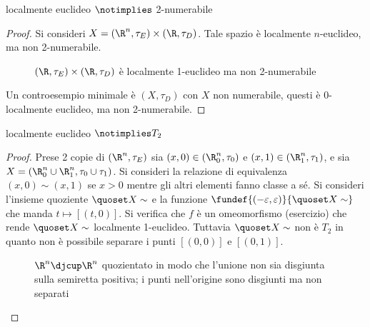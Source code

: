 \begin{prop}
localmente euclideo $\notimplies$ 2-numerabile
\end{prop}
\begin{proof} 
Si consideri $X = (\R^n, \tau _E) \times (\R, \tau _D)$.
Tale spazio è localmente $n$-euclideo, ma non 2-numerabile.

\begin{figure}
	\centering
	
	\caption{$(\R,\tau_E)\times(\R,\tau_D)$ è localmente 1-euclideo ma non 2-numerabile}
\end{figure}

Un controesempio minimale è $(X, \tau _D)$ con $X$ non numerabile, questi è 0-localmente euclideo, ma non 2-numerabile.
\end{proof}

\begin{prop}
localmente euclideo $\notimplies T_2$
\end{prop}
\begin{proof}
Prese 2 copie di $(\R^n, \tau _E)$ sia $(x,0) \in (\R^n_0, \tau _0)$  e $(x,1) \in (\R^n_1, \tau _1)$, e sia $X = (\R^n_0 \cup \R^n_1, \tau _0 \cup \tau _1)$. Si consideri la relazione di equivalenza $(x,0)\sim(x,1)$ se $x>0$ mentre gli altri elementi fanno classe a sé. Si consideri l'insieme quoziente $\quoset X\sim$ e la funzione $\fundef{(-\varepsilon,\varepsilon)}{\quoset X\sim}$ che manda $t \mapsto [(t,0)]$. Si verifica che $f$ è un omeomorfismo (esercizio) che rende $\quoset X\sim$ localmente 1-euclideo. Tuttavia $\quoset X\sim$ non è $T_2$ in quanto non è possibile separare i punti $[(0,0)]$ e $[(0,1)].$
\begin{figure}
	\centering
	
	\caption{$\R^n\djcup\R^n$ quozientato in modo che l'unione non sia disgiunta sulla semiretta positiva; i punti nell'origine sono disgiunti ma non separati}
\end{figure}
\end{proof}


